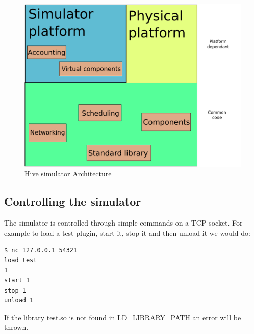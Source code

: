
\begin{figure}[htb]
  \begin{center}
    \includegraphics[scale=0.75]{img/bigarch.pdf}
    \caption{Hive simulator Architecture}
  \end{center}
\end{figure}


\subsection{Controlling the simulator}

The simulator is controlled through simple commands on a TCP socket. For
example to load a test plugin, start it, stop it and then unload it we would
do:
\begin{lstlisting}
$ nc 127.0.0.1 54321
load test
1
start 1
stop 1
unload 1
\end{lstlisting}
If the library test.so is not found in LD_LIBRARY_PATH an error will be
thrown.
